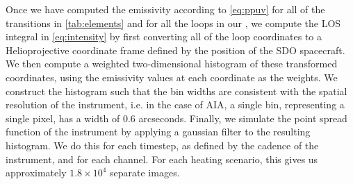Once we have computed the emissivity according to \autoref{eq:ppuv} for all of the transitions in \autoref{tab:elements} and for all the loops in our \AR{}, we compute the LOS integral in \autoref{eq:intensity} by first converting all of the loop coordinates to a Helioprojective coordinate frame defined by the position of the SDO spacecraft. We then compute a weighted two-dimensional histogram of these transformed coordinates, using the emissivity values at each coordinate as the weights. We construct the histogram such that the bin widths are consistent with the spatial resolution of the instrument, i.e. in the case of AIA, a single bin, representing a single pixel, has a width of 0.6 arcseconds. Finally, we simulate the point spread function of the instrument by applying a gaussian filter to the resulting histogram. We do this for each timestep, as defined by the cadence of the instrument, and for each channel. For each heating scenario, this gives us approximately $1.8\times10^4$ separate images.

